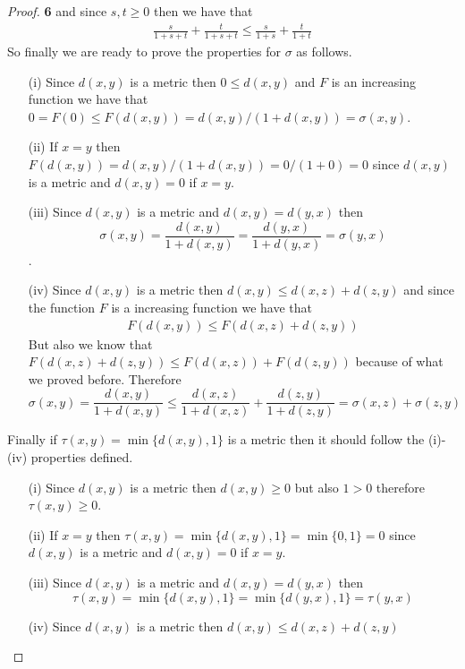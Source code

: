 \documentclass[11pt]{article}
\theoremstyle{definition}
\begin{document}
\begin{proof}{\textbf{6}}
        and since $s,t \geq 0$ then we have that
        \begin{align*}
            \frac{s}{1+s+t} + \frac{t}{1+s+t} \leq \frac{s}{1+s} + \frac{t}{1+t}
        \end{align*}
        So finally we are ready to prove the properties for $\sigma$ as follows.
        \begin{itemize}
            \item [(i)] Since $d(x,y)$ is a metric then $0 \leq d(x,y)$ and $F$ is an
            increasing function we have that
            $0 = F(0) \leq F(d(x,y)) = d(x,y)/(1+d(x,y)) = \sigma(x,y)$.
            \item [(ii)] If $x=y$ then $F(d(x,y)) = d(x,y)/(1+d(x,y)) = 0/(1+0) = 0$
            since $d(x,y)$ is a metric and $d(x,y) = 0$ if $x=y$.
            \item [(iii)] Since $d(x,y)$ is a metric and $d(x,y) = d(y,x)$ then
            $$\sigma(x,y) = \frac{d(x,y)}{1 + d(x,y)} = \frac{d(y,x)}{1 + d(y,x)} = \sigma(y,x)$$.
            \item [(iv)] Since $d(x,y)$ is a metric then $d(x,y) \leq d(x,z) + d(z,y)$
            and since the function $F$ is a increasing function we have that
            \begin{align*}
                F(d(x,y)) \leq F(d(x,z) + d(z,y))
            \end{align*}
            But also we know that $F(d(x,z) + d(z,y)) \leq F(d(x,z)) + F(d(z,y))$
            because of what we proved before.
            Therefore
            $$\sigma(x,y) = \frac{d(x,y)}{1+d(x,y)} \leq
            \frac{d(x,z)}{1+d(x,z)} + \frac{d(z,y)}{1+d(z,y)} =
            \sigma(x,z) + \sigma(z,y)$$
        \end{itemize}
        Finally if $\tau(x,y) = \min\{d(x,y), 1\}$ is a metric then it should follow the
        (i)-(iv) properties defined.
        \begin{itemize}
            \item [(i)] Since $d(x,y)$ is a metric then $d(x,y) \geq 0$ but also $1 > 0$
            therefore $\tau(x,y) \geq 0$.
            \item [(ii)] If $x=y$ then $\tau(x,y) = \min\{d(x,y), 1\} = \min\{0, 1\} = 0$
            since $d(x,y)$ is a metric and $d(x,y) = 0$ if $x=y$.
            \item [(iii)] Since $d(x,y)$ is a metric and $d(x,y) = d(y,x)$ then
            $$\tau(x,y) = \min\{d(x,y), 1\} = \min\{d(y,x), 1\} = \tau(y,x)$$
            \item [(iv)] Since $d(x,y)$ is a metric then $d(x,y) \leq d(x,z) + d(z,y)$

\end{itemize}
\end{proof}
\end{document}
